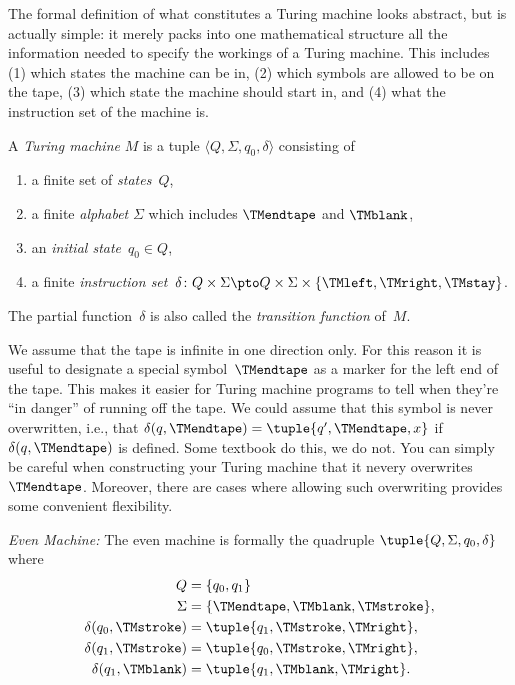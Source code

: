 \documentclass[../../../include/open-logic-section]{subfiles}
\begin{document}

\begin{explain}
The formal definition of what constitutes a Turing machine looks
abstract, but is actually simple: it merely packs into one
mathematical structure all the information needed to specify the
workings of a Turing machine. This includes (1) which states the
machine can be in, (2) which symbols are allowed to be on the tape, (3)
which state the machine should start in, and (4) what the instruction
set of the machine is.
\end{explain}

\begin{defn}
A \emph{Turing machine} $M$ is a tuple $\langle Q, \Sigma, q_0,
\delta\rangle$ consisting of
\begin{enumerate}
\item a finite set of \emph{states}~$Q$,
\item a finite \emph{alphabet} $\Sigma$ which includes $\TMendtape$ and
  $\TMblank$,
\item an \emph{initial state}~$q_0 \in Q$,
\item a finite \emph{instruction set}~$\delta\colon Q \times \Sigma
  \pto Q \times \Sigma \times \{\TMleft, \TMright, \TMstay\}$.
\end{enumerate}
The partial function~$\delta$ is also called the \emph{transition function}
of~$M$.
\end{defn}

\begin{explain}
We assume that the tape is infinite in one direction only. For this
reason it is useful to designate a special symbol~$\TMendtape$ as a
marker for the left end of the tape. This makes it easier for Turing
machine programs to tell when they're ``in danger'' of running off the
tape. We could assume that this symbol is never overwritten, i.e.,
that $\delta(q,\TMendtape) = \tuple{q', \TMendtape, x}$ if
$\delta(q,\TMendtape)$ is defined. Some textbook do this, we do not.
You can simply be careful when constructing your Turing machine that
it nevery overwrites~$\TMendtape$.  Moreover, there are cases where
allowing such overwriting provides some convenient flexibility.
\end{explain}

\begin{ex}
\emph{Even Machine:} The even machine is formally
the quadruple $\tuple{Q, \Sigma, q_0, \delta}$ where
\begin{align*}
Q & = \{ q_0, q_1 \} \\
\Sigma & = \{ \TMendtape, \TMblank, \TMstroke \}, \\
\delta(q_0, \TMstroke) & = \tuple{q_1, \TMstroke, \TMright},\\
\delta(q_1, \TMstroke) & = \tuple{q_0, \TMstroke, \TMright},\\
\delta(q_1, \TMblank)  & = \tuple{q_1, \TMblank, \TMright}.
\end{align*}
\end{ex}
\end{document}
